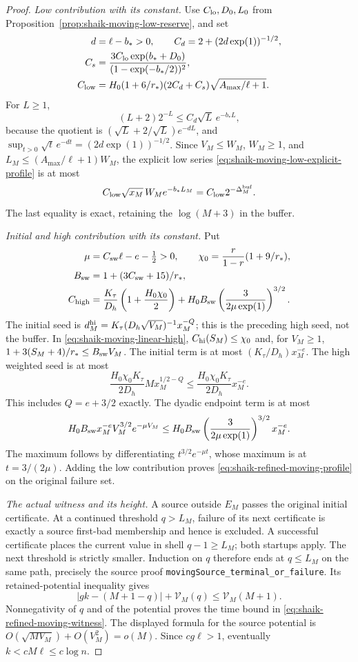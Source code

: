 \documentclass[11pt]{article}
\theoremstyle{remark}\newtheorem{remark}[proposition]{Remark}
\begin{document}
\begin{proof}
\emph{Low contribution with its constant.}
Use \(C_{\rm lo},D_0,L_0\) from
Proposition~\ref{prop:shaik-moving-low-reserve}, and set
\[
 \begin{split}
 d&=\ell-b_*>0,\qquad
 C_d=2+(2d\exp(1))^{-1/2},\\
 C_s&=\frac{3C_{\rm lo}\exp(b_*+D_0)}
                        {(1-\exp(-b_*/2))^2},\\
 C_{\rm low}
   &=H_0(1+6/r_*)(2C_d+C_s)\sqrt{A_{\max}/\ell+1}.
 \end{split}
\]
For \(L\ge1\),
\[
 (L+2)2^{-L}\le C_d\sqrt L\,e^{-b_*L},
\]
because the quotient is
\((\sqrt L+2/\sqrt L)e^{-dL}\), and
\(\sup_{t>0}\sqrt t\,e^{-dt}=(2d\exp(1))^{-1/2}\).
Since \(V_M\le W_M\), \(W_M\ge1\), and
\(L_M\le(A_{\max}/\ell+1)W_M\), the explicit low series
\eqref{eq:shaik-moving-low-explicit-profile} is at most
\[
 C_{\rm low}\sqrt{x_M}\,W_M e^{-b_*L_M}
                  =C_{\rm low}2^{-\Delta_M^{\rm buf}}.
\]
The last equality is exact, retaining the \(\log(M+3)\) in the buffer.

\emph{Initial and high contribution with its constant.}
Put
\[
 \begin{split}
 \mu&=C_{\rm sw}\ell-e-\tfrac12>0,\qquad
 \chi_0=\frac r{1-r}(1+9/r_*),\\
 B_{\rm sw}&=1+(3C_{\rm sw}+15)/r_*,\\
 C_{\rm high}
   &=\frac{K_\tau}{D_h}
       \left(1+\frac{H_0\chi_0}{2}\right)
       +H_0B_{\rm sw}
             \left(\frac{3}{2\mu\exp(1)}\right)^{3/2}.
 \end{split}
\]
The initial seed is
\(d_M^{\rm hi}=K_\tau(D_h\sqrt{V_M})^{-1}x_M^{-Q}\);
this is the preceding high seed, not the buffer.
In \eqref{eq:shaik-moving-linear-high},
\(C_{\rm hi}(S_M)\le\chi_0\) and, for \(V_M\ge1\),
\(1+3(S_M+4)/r_*\le B_{\rm sw}V_M\).
The initial term is at most \((K_\tau/D_h)x_M^{-e}\).
The high weighted seed is at most
\[
 \frac{H_0\chi_0K_\tau}{2D_h}
 M x_M^{1/2-Q}\le
 \frac{H_0\chi_0K_\tau}{2D_h}x_M^{-e}.
\]
This includes \(Q=e+3/2\) exactly. The dyadic endpoint term is at most
\[
 H_0B_{\rm sw}x_M^{-e}V_M^{3/2}e^{-\mu V_M}
 \le H_0B_{\rm sw}
        \left(\frac3{2\mu\exp(1)}\right)^{3/2}x_M^{-e}.
\]
The maximum follows by differentiating
\(t^{3/2}e^{-\mu t}\), whose maximum is at \(t=3/(2\mu)\).
Adding the low contribution proves
\eqref{eq:shaik-refined-moving-profile} on the original failure set.

\emph{The actual witness and its height.}
A source outside \(E_M\) passes the original initial certificate.
At a continued threshold \(q>L_M\), failure of its next certificate
is exactly a source first-bad membership and hence is excluded.
A successful certificate places the current value in shell
\(q-1\ge L_M\); both startups apply. The next threshold is strictly
smaller. Induction on \(q\) therefore ends at \(q\le L_M\) on the
same path, precisely the source proof
\texttt{movingSource\_terminal\_or\_failure}.
Its retained-potential inequality gives
\[
 |gk-(M+1-q)|+\mathcal V_M(q)\le\mathcal V_M(M+1).
\]
Nonnegativity of \(q\) and of the potential proves the time bound in
\eqref{eq:shaik-refined-moving-witness}. The displayed formula for the
source potential is \(O(\sqrt{MV_M})+O(V_M^2)=o(M)\).
Since \(cg\ell>1\), eventually \(k<cM\ell\le c\log n\).


\end{proof}
\end{document}
